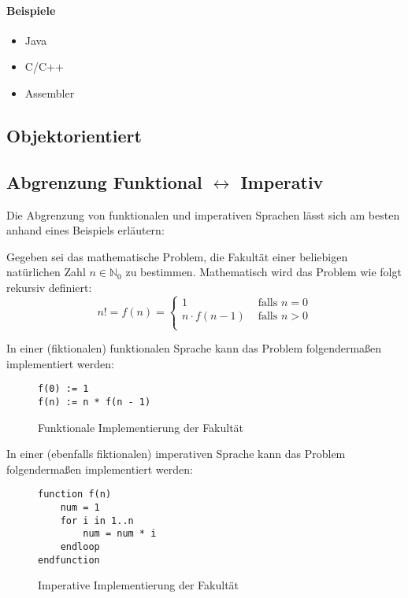 		\paragraph{Beispiele}
			\begin{itemize}
				\item Java
				\item C/C++
				\item Assembler
			\end{itemize}
	
	\subsection{Objektorientiert}
	
	\subsection{Abgrenzung Funktional $ \leftrightarrow $ Imperativ}
		\label{sec:paradigma_abgrenzung_funktional_imperativ}
		
		Die Abgrenzung von funktionalen und imperativen Sprachen lässt sich am besten anhand eines Beispiels erläutern:
		
		Gegeben sei das mathematische Problem, die Fakultät einer beliebigen natürlichen Zahl $ n \in \mathbb{N} _ 0 $ zu bestimmen. Mathematisch wird das Problem wie folgt rekursiv definiert:
		\begin{equation*}
			n! = f(n) = \begin{cases*}
				1 & \text{ falls } n = 0 \\
				n \cdot f(n - 1) & \text{ falls } n > 0 \\
			\end{cases*}
		\end{equation*}
		
		In einer (fiktionalen) funktionalen Sprache kann das Problem folgendermaßen implementiert werden:
		\begin{figure}[H]
			\centering
			\begin{lstlisting}
f(0) := 1
f(n) := n * f(n - 1)
			\end{lstlisting}
			\caption{Funktionale Implementierung der Fakultät}
		\end{figure}
		
		In einer (ebenfalls fiktionalen) imperativen Sprache kann das Problem folgendermaßen implementiert werden:
		\begin{figure}[H]
			\centering
			\begin{lstlisting}
function f(n)
	num = 1
	for i in 1..n
		num = num * i
	endloop
endfunction
			\end{lstlisting}
			\caption{Imperative Implementierung der Fakultät}
		\end{figure}
